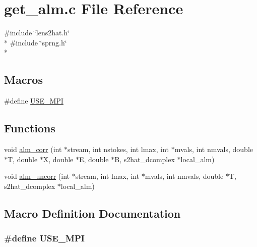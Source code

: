 \section{get\-\_\-alm.\-c File Reference}
\label{derivatives__nersc_2get__alm_8c}
{\ttfamily \#include \char`\"{}lens2hat.\-h\char`\"{}}\\*
{\ttfamily \#include \char`\"{}sprng.\-h\char`\"{}}\\*
\subsection*{Macros}
\begin{DoxyCompactItemize}
\item 
\#define \hyperlink{derivatives__nersc_2get__alm_8c_a3869d282031f6ea6b50fdb980b758420}{U\-S\-E\-\_\-\-M\-P\-I}
\end{DoxyCompactItemize}
\subsection*{Functions}
\begin{DoxyCompactItemize}
\item 
void \hyperlink{derivatives__nersc_2get__alm_8c_a80f1d7977e804f028cad6821ef147f4b}{alm\-\_\-corr} (int $\ast$stream, int nstokes, int lmax, int $\ast$mvals, int nmvals, double $\ast$T, double $\ast$X, double $\ast$E, double $\ast$B, s2hat\-\_\-dcomplex $\ast$local\-\_\-alm)
\item 
void \hyperlink{derivatives__nersc_2get__alm_8c_a58e31a888c3017dccbcf950b073dd2e9}{alm\-\_\-uncorr} (int $\ast$stream, int lmax, int $\ast$mvals, int nmvals, double $\ast$T, s2hat\-\_\-dcomplex $\ast$local\-\_\-alm)
\end{DoxyCompactItemize}


\subsection{Macro Definition Documentation}
\subsubsection[{U\-S\-E\-\_\-\-M\-P\-I}]{\setlength{\rightskip}{0pt plus 5cm}\#define U\-S\-E\-\_\-\-M\-P\-I}\label{derivatives__nersc_2get__alm_8c_a3869d282031f6ea6b50fdb980b758420}



